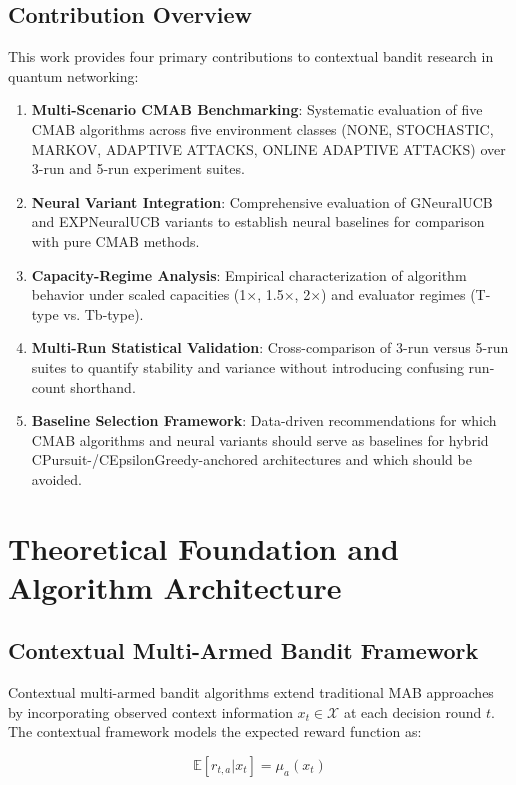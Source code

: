 \documentclass[12pt,a4paper]{article}
\begin{document}
\subsection{Contribution Overview}

This work provides four primary contributions to contextual bandit research in quantum networking:

\begin{enumerate}
\item \textbf{Multi-Scenario CMAB Benchmarking}: Systematic evaluation of five CMAB algorithms across five environment classes (NONE, STOCHASTIC, MARKOV, ADAPTIVE ATTACKS, ONLINE ADAPTIVE ATTACKS) over 3-run and 5-run experiment suites.
\item \textbf{Neural Variant Integration}: Comprehensive evaluation of GNeuralUCB and EXPNeuralUCB variants to establish neural baselines for comparison with pure CMAB methods.
\item \textbf{Capacity-Regime Analysis}: Empirical characterization of algorithm behavior under scaled capacities (1$\times$, 1.5$\times$, 2$\times$) and evaluator regimes (T-type vs. Tb-type).
\item \textbf{Multi-Run Statistical Validation}: Cross-comparison of 3-run versus 5-run suites to quantify stability and variance without introducing confusing run-count shorthand.
\item \textbf{Baseline Selection Framework}: Data-driven recommendations for which CMAB algorithms and neural variants should serve as baselines for hybrid CPursuit-/CEpsilonGreedy-anchored architectures and which should be avoided.
\end{enumerate}

\newpage
\section{Theoretical Foundation and Algorithm Architecture}

\subsection{Contextual Multi-Armed Bandit Framework}

Contextual multi-armed bandit algorithms extend traditional MAB approaches by incorporating observed context information $x_t \in \mathcal{X}$ at each decision round $t$. The contextual framework models the expected reward function as:

\begin{equation}
\mathbb{E}[r_{t,a} | x_t] = \mu_a(x_t)
\end{equation}
\end{document}
